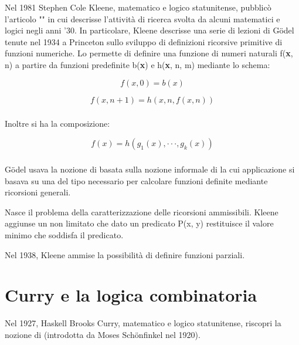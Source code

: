 Nel 1981 Stephen Cole Kleene, matematico e logico statunitense,
pubblicò l'articolo "" in cui
descrisse l'attività di ricerca svolta da alcuni matematici
e logici negli anni '30. In particolare, Kleene descrisse
una serie di lezioni di G\"odel tenute nel 1934 a Princeton
sullo sviluppo di definizioni ricorsive primitive di funzioni 
numeriche. Lo  permette di
definire una funzione di numeri naturali f(\textbf{x}, n) a partire da funzioni 
predefinite b(\textbf{x}) e h(\textbf{x}, n, m) mediante lo schema:

$$f(x, 0) = b(x)$$

$$f(x, n + 1) = h(x, n , f(x, n))$$
\subsubsection*{}
Inoltre si ha la composizione:

$$f(x) = h(g_1(x), \cdot\cdot\cdot, g_k(x))$$

\subsubsection*{}

G\"odel usava la nozione di  basata
sulla nozione informale di  la cui
applicazione si basava su una  del tipo
necessario per calcolare funzioni definite mediante ricorsioni generali.

Nasce il problema della caratterizzazione delle ricorsioni ammissibili.
Kleene aggiunse un  non limitato
che dato un predicato P(x, y) restituisce il valore minimo che soddisfa
il predicato. 

Nel 1938, Kleene ammise la possibilità di definire funzioni
parziali.

\section{Curry e la logica combinatoria}

Nel 1927, Haskell Brooks Curry, matematico e logico statunitense,
riscopri la nozione di  (introdotta da
Moses Sch\"onfinkel nel 1920).


